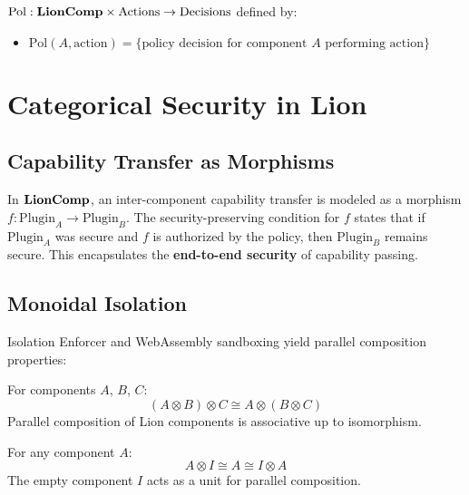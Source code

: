 \begin{definition}
$\text{Pol}: \mathbf{LionComp} \times \text{Actions} \to \text{Decisions}$ defined by:
\begin{itemize}
\item $\text{Pol}(A, \text{action}) = \{\text{policy decision for component } A \text{ performing action}\}$
\end{itemize}
\end{definition}

\newpage

\section{Categorical Security in Lion}

\subsection{Capability Transfer as Morphisms}

In $\mathbf{LionComp}$, an inter-component capability transfer is modeled as a morphism $f: \text{Plugin}_A \to \text{Plugin}_B$. The security-preserving condition for $f$ states that if $\text{Plugin}_A$ was secure and $f$ is authorized by the policy, then $\text{Plugin}_B$ remains secure. This encapsulates the \textbf{end-to-end security} of capability passing.

\subsection{Monoidal Isolation}

Isolation Enforcer and WebAssembly sandboxing yield parallel composition properties:

\begin{theorem}[Associativity]
For components $A$, $B$, $C$:
\begin{equation}
(A \otimes B) \otimes C \cong A \otimes (B \otimes C)
\end{equation}
Parallel composition of Lion components is associative up to isomorphism.
\end{theorem}

\begin{theorem}
For any component $A$:
\begin{equation}
A \otimes I \cong A \cong I \otimes A
\end{equation}
The empty component $I$ acts as a unit for parallel composition.
\end{theorem}

